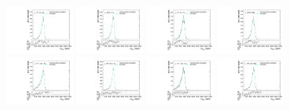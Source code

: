 \begin{figure}[htpb]
  \centering
  \includegraphics[width=0.2\textwidth]{fig/2Dfit/templateVsReco_WprToWH2000_r0_MVV_mu_HP_bb_LDy_linear.pdf}
  \includegraphics[width=0.2\textwidth]{fig/2Dfit/templateVsReco_WprToWH2000_r0_MVV_mu_LP_bb_LDy_linear.pdf}
  \includegraphics[width=0.2\textwidth]{fig/2Dfit/templateVsReco_WprToWH2000_r0_MVV_mu_HP_bb_HDy_linear.pdf}
  \includegraphics[width=0.2\textwidth]{fig/2Dfit/templateVsReco_WprToWH2000_r0_MVV_mu_LP_bb_HDy_linear.pdf}\\
  \includegraphics[width=0.2\textwidth]{fig/2Dfit/templateVsReco_WprToWH2000_r0_MVV_mu_HP_nobb_LDy_linear.pdf}
  \includegraphics[width=0.2\textwidth]{fig/2Dfit/templateVsReco_WprToWH2000_r0_MVV_mu_LP_nobb_LDy_linear.pdf}
  \includegraphics[width=0.2\textwidth]{fig/2Dfit/templateVsReco_WprToWH2000_r0_MVV_mu_HP_nobb_HDy_linear.pdf}
  \includegraphics[width=0.2\textwidth]{fig/2Dfit/templateVsReco_WprToWH2000_r0_MVV_mu_LP_nobb_HDy_linear.pdf}\\

\end{figure}
